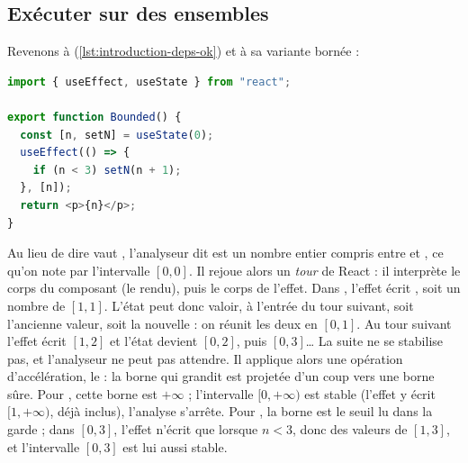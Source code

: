 \subsection{Exécuter sur des ensembles}

Revenons à  (\cref{lst:introduction-deps-ok}) et à sa variante
bornée :

\begin{lstlisting}[language=TypeScript,caption={\code{Bounded} : la même boucle, gardée (\file{/tmp/ch01/bounded.tsx})},label={lst:introduction-bounded}]
import { useEffect, useState } from "react";

export function Bounded() {
  const [n, setN] = useState(0);
  useEffect(() => {
    if (n < 3) setN(n + 1);
  }, [n]);
  return <p>{n}</p>;
}
\end{lstlisting}

Au lieu de dire \og {} vaut \fg{}, l'analyseur dit \og {}
est un nombre entier compris entre  et \fg{}, ce qu'on note par
l'intervalle $[0,0]$. Il rejoue alors un \emph{tour} de React : il interprète le
corps du composant (le rendu), puis le corps de l'effet. Dans ,
l'effet écrit , soit un nombre de $[1,1]$. L'état  peut
donc valoir, à l'entrée du tour suivant, soit l'ancienne valeur, soit la
nouvelle : on réunit les deux en $[0,1]$. Au tour suivant l'effet écrit
$[1,2]$ et l'état devient $[0,2]$, puis $[0,3]$\dots{} La suite ne se stabilise
pas, et l'analyseur ne peut pas attendre. Il applique alors une opération
d'accélération, le  : la borne qui grandit est projetée d'un
coup vers une borne sûre. Pour , cette borne est $+\infty$ ;
l'intervalle $[0,+\infty)$ est stable (l'effet y écrit $[1,+\infty)$, déjà
inclus), l'analyse s'arrête. Pour , la borne est le seuil
 lu dans la garde  ; dans $[0,3]$, l'effet n'écrit que
lorsque $n<3$, donc des valeurs de $[1,3]$, et l'intervalle $[0,3]$ est lui
aussi stable.

